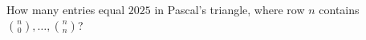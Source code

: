 How many entries equal $2025$ in Pascal's triangle, where row $n$ contains $\binom n0,\ldots,\binom nn$?
